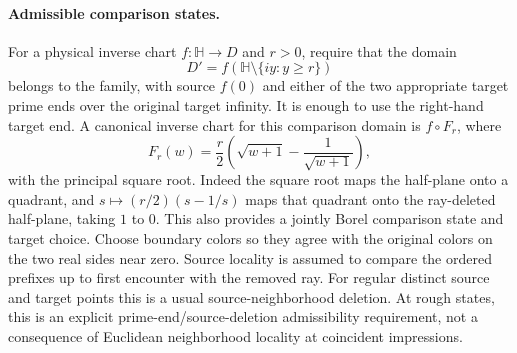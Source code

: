 \documentclass[11pt]{article}
\theoremstyle{definition}\newtheorem{definition}[theorem]{Definition}
\theoremstyle{remark}\newtheorem{remark}[theorem]{Remark}
\begin{document}
\paragraph{Admissible comparison states.}
For a physical inverse chart $f:\mathbb H\to D$ and $r>0$, require
that the domain
\[
 D'=f(\mathbb H\setminus\{iy:y\ge r\})
 \tag{RL1}
\]
belongs to the family, with source $f(0)$ and either of the two
appropriate target prime ends over the original target infinity.
It is enough to use the right-hand target end. A canonical inverse
chart for this comparison domain is $f\circ F_r$, where
\[
 F_r(w)=\frac r2\left(\sqrt{w+1}-\frac1{\sqrt{w+1}}\right),
 \tag{RL1a}
\]
with the principal square root. Indeed the square root maps the half-plane
onto a quadrant, and $s\mapsto(r/2)(s-1/s)$ maps that quadrant onto
the ray-deleted half-plane, taking $1$ to $0$. This also provides a
jointly Borel comparison state and target choice. Choose boundary colors
so they agree with the original colors on the two real sides near zero. Source locality is assumed to compare
the ordered prefixes up to first encounter with the removed ray.
For regular distinct source and target points this is a usual
source-neighborhood deletion. At rough states, this is an explicit
prime-end/source-deletion admissibility requirement, not a consequence
of Euclidean neighborhood locality at coincident impressions.
\end{document}
